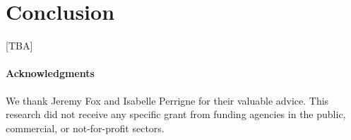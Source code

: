 \documentclass[11pt, a4paper]{article}
\begin{document}






\section{Conclusion}
[TBA]


\paragraph{Acknowledgments}
We thank Jeremy Fox and Isabelle Perrigne for their valuable advice. This research did not receive any specific grant from funding agencies in the public, commercial, or not-for-profit sectors. 
\end{document}
